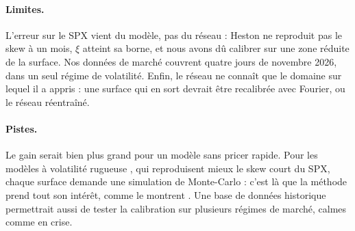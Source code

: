 \paragraph{Limites.} L'erreur sur le SPX vient du modèle, pas du réseau : Heston ne reproduit pas le skew à un mois,
$\xi$ atteint sa borne, et nous avons dû calibrer sur une zone réduite de la surface. Nos données de marché couvrent
quatre jours de novembre 2026, dans un seul régime de volatilité. Enfin, le réseau ne connaît que le domaine sur
lequel il a appris : une surface qui en sort devrait être recalibrée avec Fourier, ou le réseau réentraîné.

\paragraph{Pistes.} Le gain serait bien plus grand pour un modèle sans pricer rapide. Pour les modèles à volatilité
rugueuse \citep{gatheral2018}, qui reproduisent mieux le skew court du SPX, chaque surface demande une simulation de
Monte-Carlo : c'est là que la méthode prend tout son intérêt, comme le montrent \citet{horvath2021}. Une base de
données historique permettrait aussi de tester la calibration sur plusieurs régimes de marché, calmes comme en
crise.
